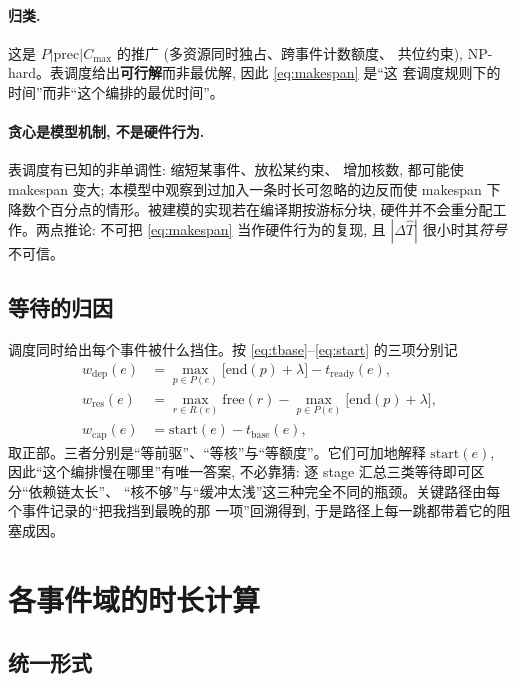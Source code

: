 \documentclass[11pt,a4paper]{article}
\begin{document}
\paragraph{归类.} 这是 $P|\mathrm{prec}|C_{\max}$ 的推广 (多资源同时独占、跨事件计数额度、
共位约束), NP-hard。表调度给出\textbf{可行解}而非最优解, 因此 \eqref{eq:makespan} 是``这
套调度规则下的时间''而非``这个编排的最优时间''。

\paragraph{贪心是模型机制, 不是硬件行为.} 表调度有已知的非单调性: 缩短某事件、放松某约束、
增加核数, 都可能使 makespan 变大; 本模型中观察到过加入一条时长可忽略的边反而使 makespan
下降数个百分点的情形。被建模的实现若在编译期按游标分块, 硬件并不会重分配工作。两点推论:
不可把 \eqref{eq:makespan} 当作硬件行为的复现, 且 $|\Delta\widehat{T}|$ 很小时其\emph{符号}
不可信。

\subsection{等待的归因}
\label{sec:attrib}

调度同时给出每个事件被什么挡住。按 \eqref{eq:tbase}--\eqref{eq:start} 的三项分别记
\begin{align}
w_{\text{dep}}(e) &= \max_{p\in P(e)}\big[\mathrm{end}(p)+\lambda\big] - t_{\text{ready}}(e),
   \label{eq:w-dep}\\
w_{\text{res}}(e) &= \max_{r\in R(e)} \mathrm{free}(r) -
   \max_{p\in P(e)}\big[\mathrm{end}(p)+\lambda\big],
   \label{eq:w-res}\\
w_{\text{cap}}(e) &= \mathrm{start}(e) - t_{\text{base}}(e),
   \label{eq:w-cap}
\end{align}
取正部。三者分别是``等前驱''、``等核''与``等额度''。它们可加地解释 $\mathrm{start}(e)$,
因此``这个编排慢在哪里''有唯一答案, 不必靠猜: 逐 stage 汇总三类等待即可区分``依赖链太长''、
``核不够''与``缓冲太浅''这三种完全不同的瓶颈。关键路径由每个事件记录的``把我挡到最晚的那
一项''回溯得到, 于是路径上每一跳都带着它的阻塞成因。

\section{各事件域的时长计算}
\label{sec:formula}

\subsection{统一形式}
\label{sec:unified}
\end{document}
